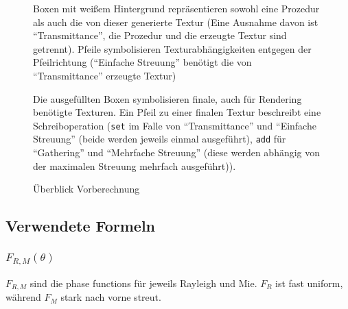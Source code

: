 \begin{figure}[H]


	Boxen mit weißem Hintergrund repräsentieren sowohl eine Prozedur als auch die von dieser generierte Textur (Eine
	Ausnahme davon ist \enquote{Transmittance}, die Prozedur und die erzeugte Textur sind getrennt). Pfeile
	symbolisieren Texturabhängigkeiten entgegen der Pfeilrichtung (\enquote{Einfache Streuung} benötigt die von
	\enquote{Transmittance} erzeugte Textur)

	Die ausgefüllten Boxen symbolisieren finale, auch für Rendering benötigte Texturen. Ein Pfeil zu einer finalen
	Textur beschreibt eine Schreiboperation (\texttt{set} im Falle von \enquote{Transmittance} und \enquote{Einfache
	Streuung} (beide werden jeweils einmal ausgeführt), \texttt{add} für \enquote{Gathering} und \enquote{Mehrfache
	Streuung} (diese werden abhängig von der maximalen Streuung mehrfach ausgeführt)).

	\caption{Überblick Vorberechnung}
	\label{precomp}
\end{figure}


\subsection{Verwendete Formeln} \label{formeln}
\subsubsection{$F_{R,M}(\theta)$}
$F_{R,M}$ sind die phase functions für jeweils Rayleigh und Mie. $F_R$ ist fast uniform, während $F_M$ stark nach vorne
streut.

